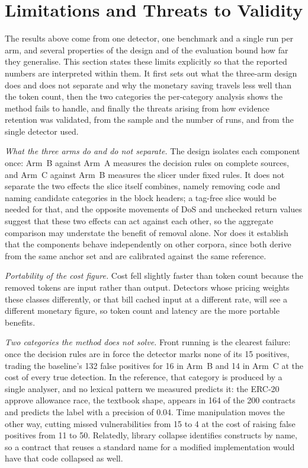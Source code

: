 \documentclass{ieeeaccess}
\begin{document}
\section{Limitations and Threats to Validity}\label{sec:limit}
The results above come from one detector, one benchmark and a single run per arm, and several properties of the design and of the evaluation bound how far they generalise. This section states these limits explicitly so that the reported numbers are interpreted within them. It first sets out what the three-arm design does and does not separate and why the monetary saving travels less well than the token count, then the two categories the per-category analysis shows the method fails to handle, and finally the threats arising from how evidence retention was validated, from the sample and the number of runs, and from the single detector used.

\smallskip
\noindent\emph{What the three arms do and do not separate.} The design isolates each component once: Arm~B against Arm~A measures the decision rules on complete sources, and Arm~C against Arm~B measures the slicer under fixed rules. It does not separate the two effects the slice itself combines, namely removing code and naming candidate categories in the block headers; a tag-free slice would be needed for that, and the opposite movements of DoS and unchecked return values suggest that these two effects can act against each other, so the aggregate comparison may understate the benefit of removal alone. Nor does it establish that the components behave independently on other corpora, since both derive from the same anchor set and are calibrated against the same reference.

\smallskip
\noindent\emph{Portability of the cost figure.} Cost fell slightly faster than token count because the removed tokens are input rather than output. Detectors whose pricing weights these classes differently, or that bill cached input at a different rate, will see a different monetary figure, so token count and latency are the more portable benefits.

\smallskip
\noindent\emph{Two categories the method does not solve.} Front running is the clearest failure: once the decision rules are in force the detector marks none of its 15 positives, trading the baseline's 132 false positives for 16 in Arm~B and 14 in Arm~C at the cost of every true detection. In the reference, that category is produced by a single analyser, and no lexical pattern we measured predicts it: the ERC-20 approve allowance race, the textbook shape, appears in 164 of the 200 contracts and predicts the label with a precision of 0.04. Time manipulation moves the other way, cutting missed vulnerabilities from 15 to 4 at the cost of raising false positives from 11 to 50. Relatedly, library collapse identifies constructs by name, so a contract that reuses a standard name for a modified implementation would have that code collapsed as well.
\end{document}
